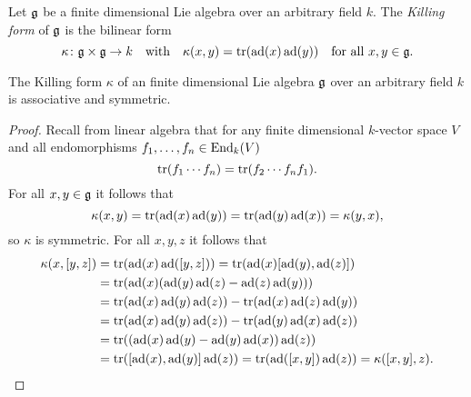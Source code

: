 \begin{defi}
 Let $\g$ be a finite dimensional Lie algebra over an arbitrary field $k$. The \emph{Killing form} of $\g$ is the bilinear form
 \[
  \kappa \colon \g \times \g \to k
  \quad\text{with}\quad
  \kappa(x,y) = \tr(\ad(x) \ad(y))
  \quad\text{for all $x,y \in \g$}.
 \]
\end{defi}


\begin{lem}\label{lem: killing form is associative and symmetric}
 The Killing form $\kappa$ of an finite dimensional Lie algebra $\g$ over an arbitrary field $k$ is associative and symmetric.
\end{lem}
\begin{proof}
 Recall from linear algebra that for any finite dimensional $k$-vector space $V$ and all endomorphisms $f_1, \dotsc, f_n \in \End_k(V)$
 \[
  \tr(f_1 \dotsm f_n) = \tr(f_2 \dotsm f_n f_1).
 \]
 For all $x,y \in \g$ it follows that
 \[
  \kappa(x,y) = \tr(\ad(x) \ad(y)) = \tr(\ad(y) \ad(x)) = \kappa(y,x),
 \]
 so $\kappa$ is symmetric. For all $x,y,z$ it follows that
 \begin{align*}
  \kappa(x,[y,z])
  &= \tr(\ad(x) \ad([y,z]))
  = \tr(\ad(x) [\ad(y), \ad(z)]) \\
  &= \tr(\ad(x) (\ad(y) \ad(z) - \ad(z) \ad(y))) \\
  &= \tr(\ad(x) \ad(y) \ad(z)) - \tr(\ad(x) \ad(z) \ad(y)) \\
  &= \tr(\ad(x) \ad(y) \ad(z)) - \tr(\ad(y) \ad(x) \ad(z)) \\
  &= \tr((\ad(x) \ad(y)- \ad(y) \ad(x)) \ad(z)) \\
  &= \tr([\ad(x), \ad(y)] \ad(z))
  = \tr(\ad([x,y]) \ad(z))
  = \kappa([x,y],z).
 \qedhere
 \end{align*}
\end{proof}


